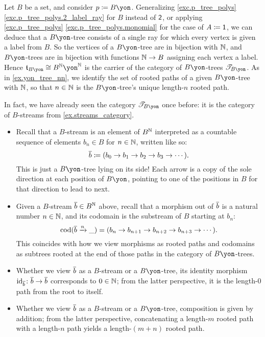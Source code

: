 \documentclass[Book-Poly]{subfiles}
\begin{document}
\begin{example}\label{ex.streams_cofree}
Let $B$ be a set, and consider $p\coloneqq B\yon$.
Generalizing \cref{exc.p_tree_polys} \cref{exc.p_tree_polys.2_label_ray} for $B$ instead of $\textsf{2}$, or applying \cref{exc.p_tree_polys} \cref{exc.p_tree_polys.monomial} for the case of $A\coloneqq\textsf{1}$, we can deduce that a $B\yon$-tree consists of a single ray for which every vertex is given a label from $B$.
So the vertices of a $B\yon$-tree are in bijection with $\mathbb{N}$, and $B\yon$-trees are in bijection with functions $\mathbb{N}\to B$ assigning each vertex a label.
Hence $\ema{t}_{B\yon}\iso B^\nn\yon^\nn$ is the carrier of the category of $B\yon$-trees $\cofree{B\yon}$.
As in \cref{ex.yon_tree_nn}, we identify the set of rooted paths of a given $B\yon$-tree with $\mathbb{N}$, so that $n\in\mathbb{N}$ is the $B\yon$-tree's unique length-$n$ rooted path.

In fact, we have already seen the category $\cofree{B\yon}$ once before: it is the category of $B$-streams from \cref{ex.streams_category}.

\begin{itemize}
    \item Recall that a $B$-stream is an element of $B^{\mathbb{N}}$ interpreted as a countable sequence of elements $b_n\in B$ for $n\in\mathbb{N}$, written like so:
    \[
        \overline{b}\coloneqq(b_0\to b_1\to b_2\to b_3\to\cdots).
    \]
    This is just a $B\yon$-tree lying on its side!
    Each arrow is a copy of the sole direction at each position of $B\yon$, pointing to one of the positions in $B$ for that direction to lead to next.
    \item Given a $B$-stream $\overline{b}\in B^{\mathbb{N}}$ above, recall that a morphism out of $\overline{b}$ is a natural number $n\in\mathbb{N}$, and its codomain is the substream of $B$ starting at $b_n$:
    \[
        \operatorname{cod}(\overline{b}\xrightarrow{n}\_)=(b_n\to b_{n+1}\to b_{n+2}\to b_{n+3}\to\cdots).
    \]
    This coincides with how we view morphisms as rooted paths and codomains as subtrees rooted at the end of those paths in the category of $B\yon$-trees.
    \item Whether we view $\overline{b}$ as a $B$-stream or a $B\yon$-tree, its identity morphism $\mathrm{id}_{\overline{b}}\colon\overline{b}\to\overline{b}$ corresponds to $0\in\mathbb{N}$; from the latter perspective, it is the length-$0$ path from the root to itself.
    \item Whether we view $\overline{b}$ as a $B$-stream or a $B\yon$-tree, composition is given by addition; from the latter perspective, concatenating a length-$m$ rooted path with a length-$n$ path yields a length-$(m+n)$ rooted path.
\end{itemize}
\end{example}
\end{document}

